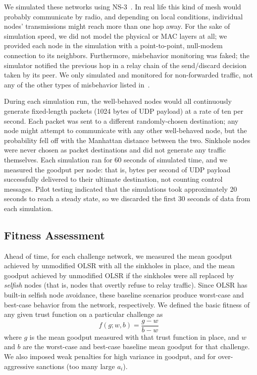 \documentclass{article}
\begin{document}
We simulated these networks using NS-3~\cite{z-ns3}.  In real life
this kind of mesh would probably communicate by radio, and depending
on local conditions, individual nodes' transmissions might reach more
than one hop away.  For the sake of simulation speed, we did not model
the physical or MAC layers at all; we provided each node in the
simulation with a point-to-point, null-modem connection to its
neighbors.  Furthermore, misbehavior monitoring was faked; the
simulator notified the previous hop in a relay chain of the
send/discard decision taken by its peer.  We only simulated and
monitored for non-forwarded traffic, not any of the other types of
misbehavior listed in~\cite{buchegger2002b}.

During each simulation run, the well-behaved nodes would all
continuously generate fixed-length packets (1024 bytes of UDP payload)
at a rate of ten per second.  Each packet was sent to a different
randomly-chosen destination; any node might attempt to communicate
with any other well-behaved node, but the probability fell off with
the Manhattan distance between the two.  Sinkhole nodes were never
chosen as packet destinations and did not generate any traffic
themselves.  Each simulation ran for 60 seconds of simulated time, and
we measured the goodput per node: that is, bytes per second of UDP
payload successfully delivered to their ultimate destination, not
counting control messages.  Pilot testing indicated that the
simulations took approximately 20 seconds to reach a steady state, so
we discarded the first 30 seconds of data from each simulation.

\subsection{Fitness Assessment}

Ahead of time, for each challenge network, we measured the mean goodput
achieved by unmodified OLSR with all the sinkholes in place, and the mean
goodput achieved by unmodified OLSR if the sinkholes were all replaced
by \emph{selfish} nodes (that is, nodes that overtly refuse to relay
traffic).  Since OLSR has built-in selfish node avoidance, these
baseline scenarios produce worst-case and best-case behavior from the
network, respectively.  We defined the basic fitness of any given
trust function on a particular challenge as
$$
f(g;w,b) = \frac{g - w}{b - w}
$$
where $g$ is the mean goodput measured with that trust function in
place, and $w$ and $b$ are the worst-case and best-case baseline mean
goodput for that challenge.  We also imposed weak penalties for high
variance in goodput, and for over-aggressive sanctions (too many large
$a_i$).
\end{document}
